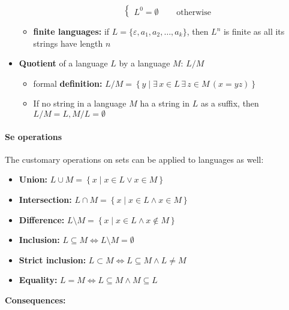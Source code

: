 \documentclass[english]{article}
\begin{document}
\begin{itemize}
\begin{itemize}
\[\begin{cases}
                    L ^ 0 = \emptyset \quad           & \text{ otherwise }
                  \end{cases}\]
          \item \textbf{finite languages:} if \(L = \{\varepsilon, a_1, a_2, \ldots, a_k\}\), then \(L^n\) is finite as all its strings have length \(n\)
        \end{itemize}
  \item \textbf{Quotient} of a language \(L\) by a language \(M\): \(L / M\)
        \begin{itemize}
          \item formal \textbf{definition:} \(L / M = \left\{y \mid \exists \, x \in L \, \exists \, z \in M \, (x = yz) \right\}\)
          \item If no string in a language \(M\) ha a string in \(L\) as a suffix, then \(L / M = L, M / L = \emptyset\)
        \end{itemize}
\end{itemize}

\paragraph{Se operations}

The customary operations on sets can be applied to languages as well:

\begin{itemize}
  \item \textbf{Union:} \(L \cup M = \left\{x \mid x \in L \lor x \in M \right\}\)
  \item \textbf{Intersection:} \(L \cap M = \left\{x \mid x \in L \land x \in M \right\}\)
  \item \textbf{Difference:} \(L \setminus M = \left\{x \mid x \in L \land x \notin M \right\}\)
  \item \textbf{Inclusion:} \(L \subseteq M \Leftrightarrow L \setminus M = \emptyset\)
  \item \textbf{Strict inclusion:} \(L \subset M \Leftrightarrow L \subseteq M \land L \neq M\)
  \item \textbf{Equality:} \(L = M \Leftrightarrow L \subseteq M \land M \subseteq L\)
\end{itemize}

\bigskip
\textbf{Consequences:}
\end{document}
